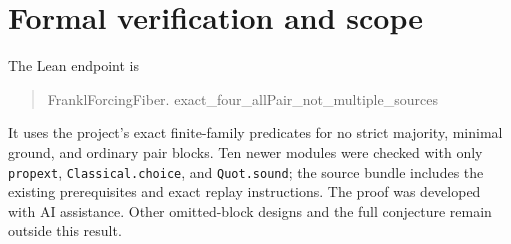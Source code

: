 \documentclass[11pt,letterpaper]{article}
\begin{document}
\section*{Formal verification and scope}
The Lean endpoint is
\begin{quote}
\small\ttfamily FranklForcingFiber.\allowbreak
exact\_four\_allPair\_not\_multiple\_sources
\end{quote}
It uses the project's exact finite-family predicates for no
strict majority, minimal ground, and ordinary pair blocks.
Ten newer modules were checked
with only \texttt{propext}, \texttt{Classical.choice}, and
\texttt{Quot.sound}; the source bundle includes the existing
prerequisites and exact replay instructions. The proof was
developed with AI assistance. Other omitted-block designs
and the full conjecture remain outside this result.
\end{document}
